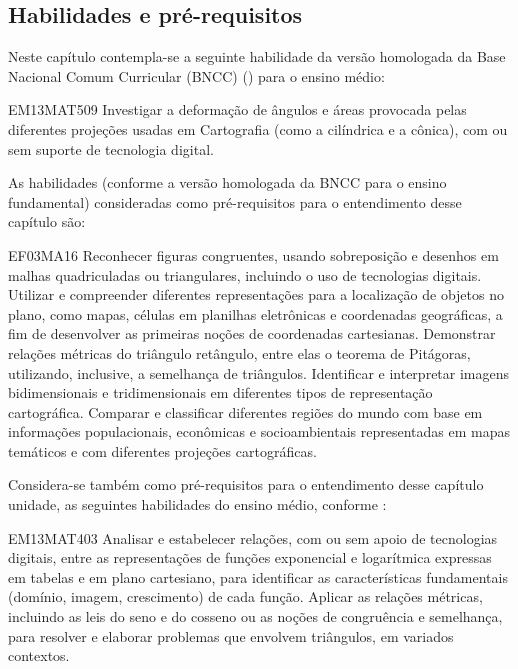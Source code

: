 \mainmatter

\begin{apresentacao}
{
\section*{Habilidades e pré-requisitos}

Neste capítulo contempla-se a seguinte habilidade da versão homologada da Base Nacional Comum Curricular (BNCC) (\cite{BNCC2018}) para o ensino médio:

\begin{habilities}{EM13MAT509}
Investigar a deformação de ângulos e áreas provocada pelas diferentes projeções usadas em Cartografia (como a cilíndrica e a cônica), com ou sem suporte de tecnologia digital.
\end{habilities}

 
As habilidades (conforme a versão homologada da BNCC para o ensino fundamental) consideradas como pré-requisitos para o entendimento desse capítulo são:

\begin{habilities}{EF03MA16}
Reconhecer figuras congruentes, usando sobreposição e desenhos em malhas quadriculadas ou triangulares, incluindo o uso de tecnologias digitais.
 Utilizar e compreender diferentes representações para a localização de objetos no plano, como mapas, células em planilhas eletrônicas e coordenadas geográficas, a fim de desenvolver as primeiras noções de coordenadas cartesianas.
 Demonstrar relações métricas do triângulo retângulo, entre elas o teorema de Pitágoras, utilizando, inclusive, a semelhança de triângulos.
Identificar e interpretar imagens bidimensionais e tridimensionais em diferentes tipos de representação cartográfica.
Comparar e classificar diferentes regiões do mundo com base em informações populacionais, econômicas e socioambientais representadas em mapas temáticos e com diferentes projeções cartográficas.
\end{habilities}


Considera-se também como pré-requisitos para o entendimento desse capítulo unidade, as seguintes habilidades do ensino médio, conforme \cite{BNCC2018}:
\begin{habilities}{EM13MAT403}
Analisar e estabelecer relações, com ou sem apoio de tecnologias digitais, entre as representações de funções exponencial e logarítmica expressas em tabelas e em plano cartesiano, para identificar as características fundamentais (domínio, imagem, crescimento) de cada função.
 Aplicar as relações métricas, incluindo as leis do seno e do cosseno ou as noções de congruência e semelhança, para resolver e elaborar problemas que envolvem triângulos, em variados contextos.
\end{habilities}

}
\end{apresentacao}
